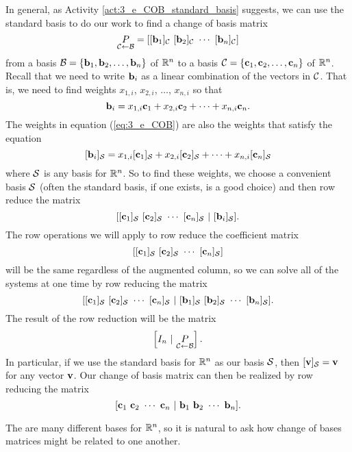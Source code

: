 In general, as Activity \ref{act:3_e_COB_standard_basis} suggests, we can use the standard basis to do our work to find a change of basis matrix 
\[\underset{\CC \leftarrow \CB}{P} = [[\vb_1]_{\CC} \ [\vb_2]_{\CC}  \  \cdots  \ [\vb_n]_{\CC}]\]
from a basis $\mathcal{B} = \{\mathbf{b}_1, \mathbf{b}_2, \ldots, \mathbf{b}_n\}$ of $\mathbb{R}^n$ to a basis $\mathcal{C} = \{\mathbf{c}_1, \mathbf{c}_2, \ldots, \mathbf{c}_n\}$ of $\mathbb{R}^n$. Recall that we need to write $\mathbf{b}_i$ as a linear combination of the vectors in $\mathcal{C}$. That is, we need to find weights $x_{1,i}$, $x_{2,i}$, $\ldots$, $x_{n,i}$ so that 
\begin{equation} \label{eq:3_e_COB} 
\mathbf{b}_i = x_{1,i}\mathbf{c}_1 + x_{2,i} \mathbf{c}_2 + \cdots + x_{n,i} \mathbf{c}_n.
\end{equation}
The weights in equation (\ref{eq:3_e_COB}) are also the weights that satisfy the equation
\[[\mathbf{b}_i]_{\mathcal{S}} = x_{1,i}[\mathbf{c}_1]_{\mathcal{S}} + x_{2,i} [\mathbf{c}_2]_{\mathcal{S}} + \cdots + x_{n,i} [\mathbf{c}_n]_{\mathcal{S}}\]
where $\mathcal{S}$ is any basis for $\mathbb{R}^n$. So to find these weights, we choose a convenient basis $\mathcal{S}$ (often the standard basis, if one exists, is a good choice) and then row reduce the matrix 
\[[[\vc_1]_{\CS} \ [\vc_2]_{\CS} \ \cdots \ [\vc_n]_{\CS} \ | \ [\vb_i]_{\CS}].\]
The row operations we will apply to row reduce the coefficient matrix 
\[[[\vc_1]_{\CS} \ [\vc_2]_{\CS} \ \cdots \ [\vc_n]_{\CS}]\]
will be the same regardless of the augmented column, so we can solve all of the systems at one time by row reducing the matrix 
\[[[\vc_1]_{\CS} \ [\vc_2]_{\CS} \ \cdots \ [\vc_n]_{\CS} \ | \ [\vb_1]_{\CS} \ [\vb_2]_{\CS} \ \cdots \ [\vb_n]_{\CS}].\]
The result of the row reduction will be the matrix 
\[\left[ I_n \ | \ \underset{\mathcal{C} \leftarrow \mathcal{B}}{P} \right].\]
In particular, if we use the standard basis for $\mathbb{R}^n$ as our basis $\mathcal{S}$, then $[\mathbf{v}]_{\mathcal{S}} = \mathbf{v}$ for any vector $\mathbf{v}$. Our change of basis matrix can then be realized by row reducing the matrix
\[[\vc_1 \ \vc_2 \ \cdots \ \vc_n \ | \ \vb_1 \ \vb_2 \ \cdots \ \vb_n].\]


\label{sec:prop_mtx_cob}

The are many different bases for $\mathbb{R}^n$, so it is natural to ask how change of bases matrices might be related to one another.

